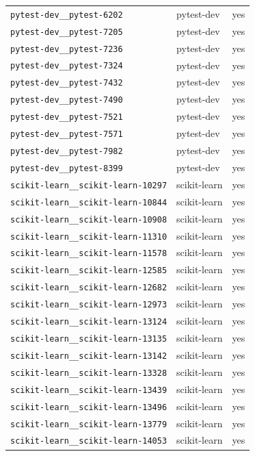 \begin{longtable}{@{}p{}lp{}@{}}
\texttt{pytest-dev\_\_pytest-6202} & pytest-dev & yes \\
\texttt{pytest-dev\_\_pytest-7205} & pytest-dev & yes \\
\texttt{pytest-dev\_\_pytest-7236} & pytest-dev & yes \\
\texttt{pytest-dev\_\_pytest-7324} & pytest-dev & yes \\
\texttt{pytest-dev\_\_pytest-7432} & pytest-dev & yes \\
\texttt{pytest-dev\_\_pytest-7490} & pytest-dev & yes \\
\texttt{pytest-dev\_\_pytest-7521} & pytest-dev & yes \\
\texttt{pytest-dev\_\_pytest-7571} & pytest-dev & yes \\
\texttt{pytest-dev\_\_pytest-7982} & pytest-dev & yes \\
\texttt{pytest-dev\_\_pytest-8399} & pytest-dev & yes \\
\texttt{scikit-learn\_\_scikit-learn-10297} & scikit-learn & yes \\
\texttt{scikit-learn\_\_scikit-learn-10844} & scikit-learn & yes \\
\texttt{scikit-learn\_\_scikit-learn-10908} & scikit-learn & yes \\
\texttt{scikit-learn\_\_scikit-learn-11310} & scikit-learn & yes \\
\texttt{scikit-learn\_\_scikit-learn-11578} & scikit-learn & yes \\
\texttt{scikit-learn\_\_scikit-learn-12585} & scikit-learn & yes \\
\texttt{scikit-learn\_\_scikit-learn-12682} & scikit-learn & yes \\
\texttt{scikit-learn\_\_scikit-learn-12973} & scikit-learn & yes \\
\texttt{scikit-learn\_\_scikit-learn-13124} & scikit-learn & yes \\
\texttt{scikit-learn\_\_scikit-learn-13135} & scikit-learn & yes \\
\texttt{scikit-learn\_\_scikit-learn-13142} & scikit-learn & yes \\
\texttt{scikit-learn\_\_scikit-learn-13328} & scikit-learn & yes \\
\texttt{scikit-learn\_\_scikit-learn-13439} & scikit-learn & yes \\
\texttt{scikit-learn\_\_scikit-learn-13496} & scikit-learn & yes \\
\texttt{scikit-learn\_\_scikit-learn-13779} & scikit-learn & yes \\
\texttt{scikit-learn\_\_scikit-learn-14053} & scikit-learn & yes \\

\end{longtable}
